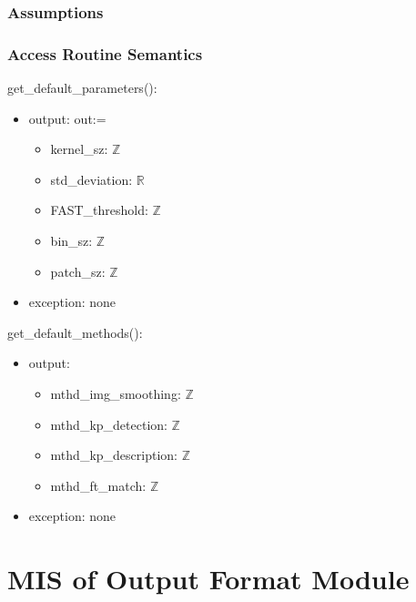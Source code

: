 \documentclass[12pt, titlepage]{article}
\begin{document}
\subsubsection{Assumptions}


\subsubsection{Access Routine Semantics}
\noindent get\_default\_parameters():
\begin{itemize}
\item output: out:= 
  \begin{itemize}
  \item kernel\_sz: $\mathbb{Z}$
  \item std\_deviation: $\mathbb{R}$ 
  \item FAST\_threshold: $\mathbb{Z}$ 
  \item bin\_sz: $\mathbb{Z}$ 
  \item patch\_sz: $\mathbb{Z}$ 
  \end{itemize}
  \item exception: none  
\end{itemize}

\noindent get\_default\_methods():
\begin{itemize}
\item output:
  \begin{itemize}
    \item mthd\_img\_smoothing: $\mathbb{Z}$
    \item mthd\_kp\_detection: $\mathbb{Z}$ 
    \item mthd\_kp\_description: $\mathbb{Z}$
    \item mthd\_ft\_match: $\mathbb{Z}$
  \end{itemize}
  \item exception: none 
\end{itemize}



\section{MIS of Output Format Module} \label{mOF}

\end{document}
